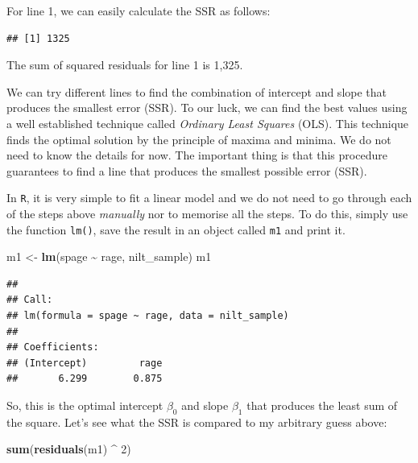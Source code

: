 \documentclass[
]{book}
\newenvironment{Shaded}{\begin{snugshade}}{\end{snugshade}}
\newcommand{\DecValTok}[1]{\textcolor[rgb]{0.00,0.00,0.81}{#1}}
\newcommand{\FunctionTok}[1]{\textcolor[rgb]{0.13,0.29,0.53}{\textbf{#1}}}
\newcommand{\NormalTok}[1]{#1}
\newcommand{\OtherTok}[1]{\textcolor[rgb]{0.56,0.35,0.01}{#1}}
\newcommand{\SpecialCharTok}[1]{\textcolor[rgb]{0.81,0.36,0.00}{\textbf{#1}}}
\begin{document}
For line 1, we can easily calculate the SSR as follows:

\begin{Shaded}
\end{Shaded}

\begin{verbatim}
## [1] 1325
\end{verbatim}

The sum of squared residuals for line 1 is 1,325.

We can try different lines to find the combination of intercept and slope that produces the smallest error (SSR). To our luck, we can find the best values using a well established technique called \emph{Ordinary Least Squares} (OLS). This technique finds the optimal solution by the principle of maxima and minima. We do not need to know the details for now. The important thing is that this procedure guarantees to find a line that produces the smallest possible error (SSR).

In \texttt{R}, it is very simple to fit a linear model and we do not need to go through each of the steps above \emph{manually} nor to memorise all the steps. To do this, simply use the function \texttt{lm()}, save the result in an object called \texttt{m1} and print it.

\begin{Shaded}
\begin{Highlighting}[]
\NormalTok{m1 }\OtherTok{\textless{}{-}} \FunctionTok{lm}\NormalTok{(spage }\SpecialCharTok{\textasciitilde{}}\NormalTok{ rage, nilt\_sample)}
\NormalTok{m1}
\end{Highlighting}
\end{Shaded}

\begin{verbatim}
## 
## Call:
## lm(formula = spage ~ rage, data = nilt_sample)
## 
## Coefficients:
## (Intercept)         rage  
##       6.299        0.875
\end{verbatim}

So, this is the optimal intercept \(\beta_0\) and slope \(\beta_1\) that produces the least sum of the square. Let's see what the SSR is compared to my arbitrary guess above:

\begin{Shaded}
\begin{Highlighting}[]
\FunctionTok{sum}\NormalTok{(}\FunctionTok{residuals}\NormalTok{(m1) }\SpecialCharTok{\^{}} \DecValTok{2}\NormalTok{)}
\end{Highlighting}
\end{Shaded}
\end{document}

